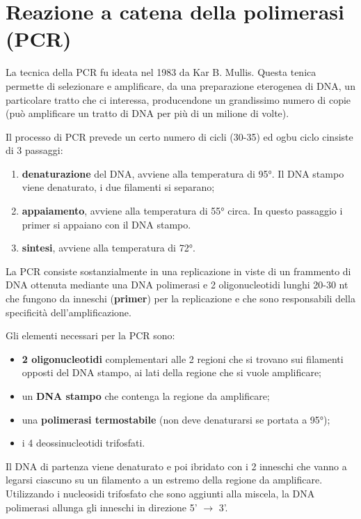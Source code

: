 \documentclass[]{article}
\date{}
\begin{document}
\section{Reazione a catena della polimerasi
(PCR)}\label{reazione-a-catena-della-polimerasi-pcr}

La tecnica della PCR fu ideata nel 1983 da Kar B. Mullis. Questa tenica
permette di selezionare e amplificare, da una preparazione eterogenea di
DNA, un particolare tratto che ci interessa, producendone un grandissimo
numero di copie (può amplificare un tratto di DNA per più di un milione
di volte).

Il processo di PCR prevede un certo numero di cicli (30-35) ed ogbu
ciclo cinsiste di 3 passaggi:

\begin{enumerate}
\def\labelenumi{\arabic{enumi}.}
\itemsep1pt\parskip0pt
\item
  \textbf{denaturazione} del DNA, avviene alla temperatura di 95°. Il
  DNA stampo viene denaturato, i due filamenti si separano;
\item
  \textbf{appaiamento}, avviene alla temperatura di 55° circa. In questo
  passaggio i primer si appaiano con il DNA stampo.
\item
  \textbf{sintesi}, avviene alla temperatura di 72°.
\end{enumerate}

La PCR consiste sostanzialmente in una replicazione in viste di un
frammento di DNA ottenuta mediante una DNA polimerasi e 2
oligonucleotidi lunghi 20-30 nt che fungono da inneschi
(\textbf{primer}) per la replicazione e che sono responsabili della
specificità dell'amplificazione.

Gli elementi necessari per la PCR sono:

\begin{itemize}
\itemsep1pt\parskip0pt
\item
  \textbf{2 oligonucleotidi} complementari alle 2 regioni che si trovano
  sui filamenti opposti del DNA stampo, ai lati della regione che si
  vuole amplificare;
\item
  un \textbf{DNA stampo} che contenga la regione da amplificare;
\item
  una \textbf{polimerasi termostabile} (non deve denaturarsi se portata
  a 95°);
\item
  i 4 deossinucleotidi trifosfati.
\end{itemize}

Il DNA di partenza viene denaturato e poi ibridato con i 2 inneschi che
vanno a legarsi ciascuno su un filamento a un estremo della regione da
amplificare. Utilizzando i nucleosidi trifosfato che sono aggiunti alla
miscela, la DNA polimerasi allunga gli inneschi in direzione 5'
\(\rightarrow\) 3'.
\end{document}
